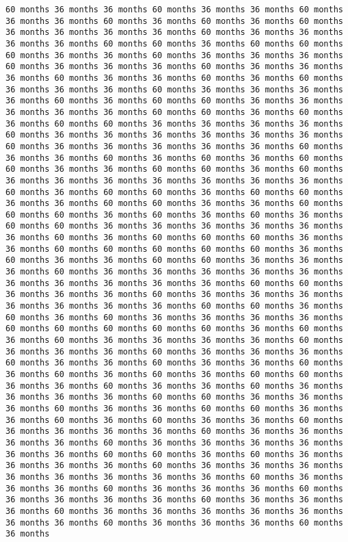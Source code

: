 \documentclass[11pt]{article}
\begin{document}
\begin{Verbatim}[commandchars=\\\{\}, frame=single, framerule=2mm, rulecolor=\color{outerrorbackground}]
60 months 36 months 36 months 60 months 36 months 36 months 60 months 36 months 36 months 60 months 36 months 60 months 36 months 60 months 36 months 36 months 36 months 36 months 60 months 36 months 36 months 36 months 36 months 60 months 60 months 36 months 60 months 60 months 60 months 36 months 36 months 60 months 36 months 36 months 36 months 60 months 36 months 36 months 36 months 60 months 36 months 36 months 36 months 60 months 36 months 36 months 60 months 36 months 60 months 36 months 36 months 36 months 60 months 36 months 36 months 36 months 36 months 60 months 36 months 60 months 60 months 36 months 36 months 36 months 36 months 36 months 60 months 60 months 36 months 60 months 36 months 60 months 60 months 36 months 36 months 36 months 36 months 60 months 36 months 36 months 36 months 36 months 36 months 36 months 60 months 36 months 36 months 36 months 36 months 36 months 60 months 36 months 36 months 60 months 36 months 60 months 36 months 60 months 60 months 36 months 36 months 60 months 60 months 36 months 60 months 36 months 36 months 36 months 36 months 36 months 36 months 36 months 60 months 36 months 60 months 60 months 36 months 60 months 60 months 36 months 36 months 60 months 60 months 36 months 36 months 60 months 60 months 60 months 36 months 60 months 36 months 60 months 36 months 60 months 60 months 36 months 36 months 36 months 36 months 36 months 36 months 60 months 36 months 60 months 60 months 60 months 36 months 36 months 60 months 60 months 60 months 60 months 60 months 36 months 60 months 36 months 36 months 60 months 60 months 36 months 36 months 36 months 60 months 36 months 36 months 36 months 36 months 36 months 36 months 36 months 36 months 36 months 36 months 60 months 60 months 36 months 36 months 36 months 60 months 36 months 36 months 36 months 36 months 36 months 36 months 36 months 60 months 60 months 36 months 60 months 36 months 60 months 36 months 36 months 36 months 36 months 60 months 60 months 60 months 60 months 60 months 36 months 60 months 36 months 60 months 36 months 36 months 36 months 36 months 60 months 36 months 36 months 36 months 60 months 36 months 36 months 36 months 60 months 36 months 36 months 60 months 36 months 36 months 60 months 36 months 60 months 36 months 60 months 36 months 60 months 60 months 36 months 36 months 60 months 36 months 36 months 60 months 36 months 36 months 36 months 36 months 60 months 60 months 36 months 36 months 36 months 60 months 36 months 36 months 60 months 60 months 36 months 36 months 60 months 36 months 60 months 36 months 36 months 60 months 36 months 36 months 36 months 36 months 60 months 36 months 36 months 36 months 36 months 60 months 36 months 36 months 36 months 36 months 36 months 36 months 60 months 60 months 36 months 60 months 36 months 36 months 36 months 36 months 60 months 36 months 36 months 36 months 36 months 36 months 36 months 36 months 36 months 60 months 36 months 36 months 36 months 60 months 36 months 36 months 36 months 60 months 36 months 36 months 36 months 36 months 60 months 36 months 36 months 36 months 60 months 36 months 36 months 36 months 36 months 36 months 36 months 36 months 60 months 36 months 36 months 36 months 60 months 36 months 
\end{Verbatim}
\end{document}
